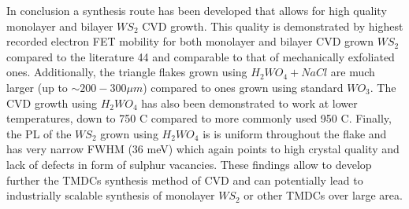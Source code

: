 In conclusion a synthesis route has been developed that allows for high quality monolayer and bilayer $WS_2$ CVD growth. This quality is demonstrated by highest recorded electron FET mobility for both monolayer and bilayer CVD grown $WS_2$ compared to the literature 44
and comparable to that of mechanically exfoliated ones. Additionally, the triangle flakes grown using $H_2WO_4 + NaCl$ are much larger (up to $\sim 200-300 {\mu}m$) compared to ones grown using standard $WO_3$. The CVD growth using $H_2WO_4$ has also been demonstrated to work at lower temperatures, down to 750 {\degree}C compared to more commonly used 950 {\degree}C. Finally, the PL of the $WS_2$ grown using $H_2WO_4$ is is uniform throughout the flake and has very narrow FWHM (36 meV) which again points to high crystal quality and lack of defects in form of sulphur vacancies. These findings allow to develop further the TMDCs synthesis method of CVD and can potentially lead to industrially scalable synthesis of monolayer $WS_2$ or other TMDCs over large area.
